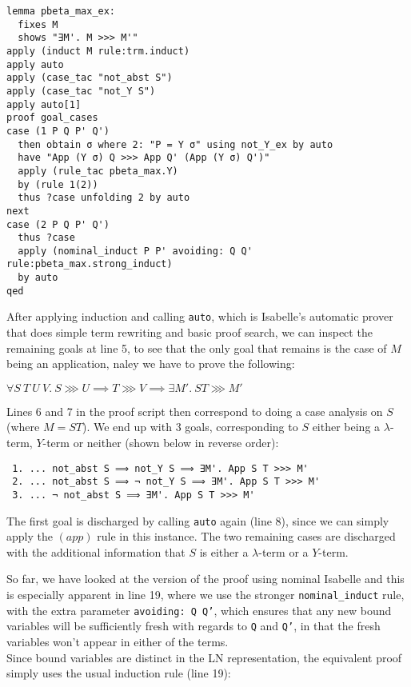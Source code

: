 \documentclass[a4paper, 12pt, twoside]{style/ociamthesis}
\theoremstyle{plain}
\theoremstyle{definition}
\theoremstyle{remark}
\begin{document}
\begin{verbatim}
lemma pbeta_max_ex:
  fixes M
  shows "∃M'. M >>> M'"
apply (induct M rule:trm.induct)
apply auto
apply (case_tac "not_abst S")
apply (case_tac "not_Y S")
apply auto[1]
proof goal_cases
case (1 P Q P' Q')
  then obtain σ where 2: "P = Y σ" using not_Y_ex by auto
  have "App (Y σ) Q >>> App Q' (App (Y σ) Q')"
  apply (rule_tac pbeta_max.Y)
  by (rule 1(2))
  thus ?case unfolding 2 by auto
next
case (2 P Q P' Q')
  thus ?case
  apply (nominal_induct P P' avoiding: Q Q' rule:pbeta_max.strong_induct)
  by auto
qed
\end{verbatim}

After applying induction and calling \texttt{auto}, which is Isabelle's
automatic prover that does simple term rewriting and basic proof search,
we can inspect the remaining goals at line 5, to see that the only goal
that remains is the case of \(M\) being an application, naley we have to
prove the following:

\begin{center}
$\forall S\ T\ U\ V.\ S \ggg U \implies T \ggg V \implies \exists M'.\ ST \ggg M'$
\end{center}

Lines 6 and 7 in the proof script then correspond to doing a case
analysis on \(S\) (where \(M = ST\)). We end up with 3 goals,
corresponding to \(S\) either being a \(\lambda\)-term, \(Y\)-term or
neither (shown below in reverse order):

\begin{verbatim}
 1. ... not_abst S ⟹ not_Y S ⟹ ∃M'. App S T >>> M'
 2. ... not_abst S ⟹ ¬ not_Y S ⟹ ∃M'. App S T >>> M'
 3. ... ¬ not_abst S ⟹ ∃M'. App S T >>> M'
\end{verbatim}

The first goal is discharged by calling \texttt{auto} again (line 8),
since we can simply apply the \((app)\) rule in this instance. The two
remaining cases are discharged with the additional information that
\(S\) is either a \(\lambda\)-term or a \(Y\)-term.

So far, we have looked at the version of the proof using nominal
Isabelle and this is especially apparent in line 19, where we use the
stronger \texttt{nominal\_induct} rule, with the extra parameter
\texttt{avoiding: Q Q'}, which ensures that any new bound variables will
be sufficiently fresh with regards to \texttt{Q} and \texttt{Q'}, in
that the fresh variables won't appear in either of the terms.\\
Since bound variables are distinct in the LN representation, the
equivalent proof simply uses the usual induction rule (line 19):
\end{document}
